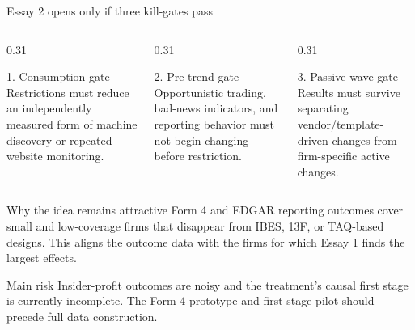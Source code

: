 \documentclass[aspectratio=169,10pt]{beamer}
\begin{document}
\begin{frame}[t]{Essay 2 opens only if three kill-gates pass}
\begin{columns}[T,onlytextwidth]
  \begin{column}{0.31\textwidth}
    \begin{block}{1. Consumption gate}
      \small Restrictions must reduce an independently measured form of machine discovery or repeated website monitoring.
    \end{block}
  \end{column}
  \begin{column}{0.31\textwidth}
    \begin{block}{2. Pre-trend gate}
      \small Opportunistic trading, bad-news indicators, and reporting behavior must not begin changing before restriction.
    \end{block}
  \end{column}
  \begin{column}{0.31\textwidth}
    \begin{block}{3. Passive-wave gate}
      \small Results must survive separating vendor/template-driven changes from firm-specific active changes.
    \end{block}
  \end{column}
\end{columns}

\vspace{0.20cm}
\begin{exampleblock}{Why the idea remains attractive}
Form 4 and EDGAR reporting outcomes cover small and low-coverage firms that disappear from IBES, 13F, or TAQ-based designs. This aligns the outcome data with the firms for which Essay 1 finds the largest effects.
\end{exampleblock}

\begin{alertblock}{Main risk}
Insider-profit outcomes are noisy and the treatment's causal first stage is currently incomplete. The Form 4 prototype and first-stage pilot should precede full data construction.
\end{alertblock}
\end{frame}
\end{document}
